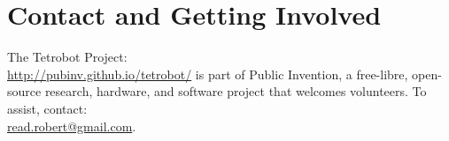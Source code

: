 \documentclass[twocolumn,10pt]{asme2ej}
\begin{document}
\section{Contact and Getting Involved}

The Tetrobot Project:\\  
\url{http://pubinv.github.io/tetrobot/} is part of Public Invention,
a free-libre, open-source research, hardware, and software project that welcomes volunteers.
To assist, contact:\\
\href{mailto:read.robert@gmail.com}{read.robert@gmail.com}.



\end{document}
